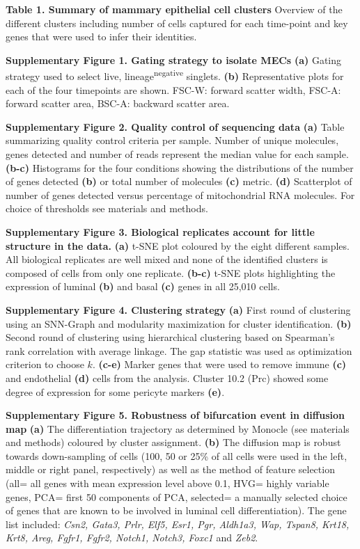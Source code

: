 \documentclass[titlepage, 12pt, oneside]{amsart}
\newcommand{\faketable}[1]%
{\refstepcounter{table}\label{#1}}
\begin{document}
\textbf{Table 1. Summary of mammary epithelial cell clusters}
\faketable{T1}
Overview of the different clusters including number of cells captured for each time-point and key genes that were used to infer their identities.

\textbf{Supplementary Figure 1. Gating strategy to isolate MECs}
\textbf{(a)} Gating strategy used to select live, lineage\textsuperscript{negative} singlets.
\textbf{(b)} Representative plots for each of the four timepoints are shown. FSC-W: forward scatter width, FSC-A: forward scatter area, BSC-A: backward scatter area.

\textbf{Supplementary Figure 2. Quality control of sequencing data}
\textbf{(a)} Table summarizing quality control criteria per sample.
Number of unique molecules, genes detected and number of reads represent the median value for each sample.
\textbf{(b-c)} Histograms for the four conditions showing the distributions of the number of genes detected \textbf{(b)} or total number of molecules \textbf{(c)} metric.
\textbf{(d)} Scatterplot of number of genes detected versus percentage of mitochondrial RNA molecules.
For choice of thresholds see materials and methods.

\textbf{Supplementary Figure 3. Biological replicates account for little structure in the data.}
\textbf{(a)} t-SNE plot coloured by the eight different samples. All biological replicates are well mixed and none of the identified clusters is composed of cells from only one replicate.
\textbf{(b-c)} t-SNE plots highlighting the expression of luminal \textbf{(b)} and basal \textbf{(c)} genes in all 25,010 cells.

\textbf{Supplementary Figure 4. Clustering strategy}
\textbf{(a)} First round of clustering using an SNN-Graph and modularity maximization for cluster identification.
\textbf{(b)} Second round of clustering using hierarchical clustering based on Spearman's rank correlation with average linkage.
The gap statistic was used as optimization criterion to choose $k$.
\textbf{(c-e)} Marker genes that were used to remove immune \textbf{(c)} and endothelial \textbf{(d)} cells from the analysis. Cluster 10.2 (Prc) showed some degree of expression for some pericyte markers \textbf{(e)}.

\textbf{Supplementary Figure 5. Robustness of bifurcation event in diffusion map}
\textbf{(a)} The differentiation trajectory as determined by Monocle (see materials and methods) coloured by cluster assignment.
\textbf{(b)} The diffusion map is robust towards down-sampling of cells (100, 50 or 25\% of all cells were used in the left, middle or right panel, respectively) as well as the method of feature selection (all= all genes with mean expression level above 0.1, HVG= highly variable genes, PCA= first 50 components of PCA, selected= a manually selected choice of genes that are known to be involved in luminal cell differentiation).
The gene list included: \textit{Csn2, Gata3, Prlr, Elf5, Esr1, Pgr, Aldh1a3, Wap, Tspan8, Krt18, Krt8, Areg, Fgfr1, Fgfr2, Notch1, Notch3, Foxc1} and \textit{Zeb2}.
\end{document}
